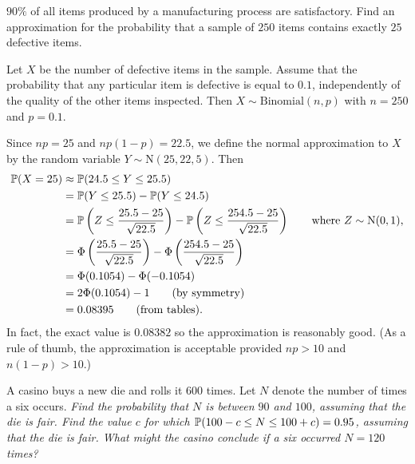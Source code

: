 \begin{exercise}
\begin{questions}
\question
$90\%$ of all items produced by a manufacturing process are satisfactory. Find an approximation for the probability that a sample of $250$ items contains exactly $25$ defective items. %


\begin{answer}
Let $X$ be the number of defective items in the sample. Assume that the probability that any particular item is defective is equal to $0.1$, independently of the quality of the other items inspected. Then $X\sim\text{Binomial}(n,p)$ with $n=250$ and $p=0.1$.

Since $np=25$ and $np(1-p)=22.5$, we define the normal approximation to $X$ by the random variable $Y\sim\text{N}(25,22,5)$. Then
\begin{align*}
\mathbb{P}(X=25)
	& \approx \mathbb{P}(24.5\leq Y\leq 25.5) \\
	& = \mathbb{P}(Y\leq 25.5) - \mathbb{P}(Y\leq 24.5) \\
	& = \mathbb{P}\left(Z\leq \frac{25.5-25}{\sqrt{22.5}}\right) - \mathbb{P}\left(Z\leq \frac{254.5-25}{\sqrt{22.5}}\right) \qquad\text{where $Z\sim\text{N}(0,1)$,}\\
	& = \Phi\left(\frac{25.5-25}{\sqrt{22.5}}\right) - \Phi\left(\frac{254.5-25}{\sqrt{22.5}}\right) \\
	& = \Phi(0.1054) - \Phi(-0.1054) \\
	& = 2\Phi(0.1054) - 1		\qquad\text{(by symmetry)} \\
	& = 0.08395 \qquad\text{(from tables).}
\end{align*}
In fact, the exact value is $0.08382$ so the approximation is reasonably good. (As a rule of thumb, the approximation is acceptable provided $np>10$ and $n(1-p)>10$.) 
\end{answer}


\question
A casino buys a new die and rolls it $600$ times. Let $N$ denote the number of times a six occurs.
\ben
\it Find the probability that $N$ is between $90$ and $100$, assuming that the die is fair.
\it Find the value $c$ for which $\mathbb{P}(100-c \leq N\leq 100+c) = 0.95$, assuming that the die is fair.
\it What might the casino conclude if a six occurred $N=120$ times?
\een 


\end{questions}
\end{exercise}

